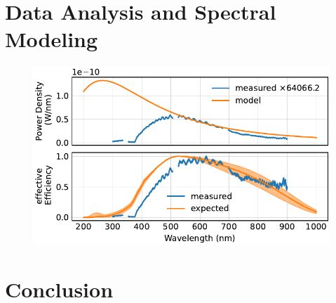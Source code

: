 \documentclass[
	parskip=half,
	a4paper,
]{scrarticle}
\begin{document}
\clearpage
\section{Data Analysis and Spectral Modeling}
\begin{figure}
    \centering
    \includegraphics{../analysis/figures/efficiency de.pdf}
    \caption{}
\end{figure}

\clearpage
\section{Conclusion}

\clearpage
\printbibliography
\end{document}
